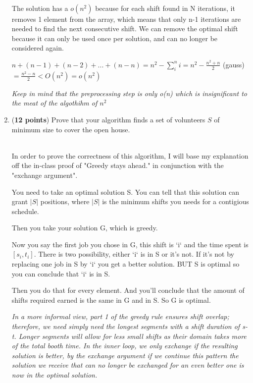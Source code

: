 \documentclass[11pt]{article}
\theoremstyle{definition}
\theoremstyle{theorem}
\newcommand{\solution}{\medskip\noindent{\color{DarkBlue}\textbf{Solution:}}}
\begin{document}
\begin{enumerate}[label=(\alph*)]
\solution \\


The solution has a $o(n^2)$ because for each shift found in N iterations, it removes 1 element from the array, which means that only n-1 iterations are needed to find the next consecutive shift. 
We can remove the optimal shift because it can only be used once per solution, and can no longer be considered again.

$n + (n-1) + (n-2) + ... + (n-n) = n^2 - \sum_{i}^{n}i = n^2 - \frac{n^2+n}{2}$ (gauss) $ = \frac{n^2-n}{2} < O(n^2) = o(n^2)$


\emph{Keep in mind that the preprocessing step is only o(n) which is insignificant to the meat of the algothihm of $n^2$}

\item (\textbf{12 points}) Prove that your algorithm finds a set of volunteers $S$ of minimum size to cover the open house. 

\solution \\
In order to prove the correctness of this algorithm, I will base my explanation off the in-class proof of "Greedy stays ahead." in conjunction with the "exchange argument".

You need to take an optimal solution S. You can tell that this solution can grant $|S|$ positions, where $|S|$ is the minimum shifts you needs for a contigious schedule.

Then you take your solution G, which is greedy.

Now you say the first job you chose in G, this shift is `i` and the time spent is $[s_i,t_i]$. There is two possibility, either `i` is in S or it's not. If it's not by replacing
one job in S by `i` you get a better solution. BUT S is optimal so you can conclude that `i` is in S. 

Then you do that for every element. And you'll conclude that the amount of shifts required earned is the same in G and in S. So G is optimal.

\emph{In a more informal view, part 1 of the greedy rule ensures shift overlap; therefore, we need simply need the longest segments with a shift duration of s-t.
Longer segments will allow for less small shifts as their domain takes more of the total booth time. In the inner loop, we only exchange if the resulting solution is better,
by the exchange argument if we continue this pattern the solution we receive that can no longer be exchanged for an even better one is now in the optimal solution.}



\end{enumerate}
\end{document}
